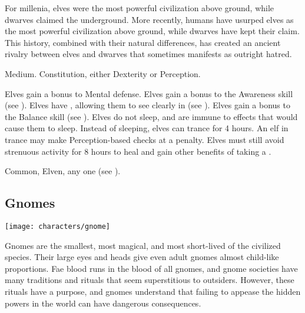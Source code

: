         For millenia, elves were the most powerful civilization above ground, while dwarves claimed the underground.
        More recently, humans have usurped elves as the most powerful civilization above ground, while dwarves have kept their claim.
        This history, combined with their natural differences, has created an ancient rivalry between elves and dwarves that sometimes manifests as outright hatred.

         Medium.
          Constitution, either  Dexterity or  Perception.
        \begin{raggeditemize}
             Elves gain a  bonus to Mental defense.
             Elves gain a  bonus to the Awareness skill (see ).
             Elves have , allowing them to see clearly in  (see ).
             Elves gain a  bonus to the Balance skill (see ).
             Elves do not sleep, and are immune to \magical effects that would cause them to sleep.
                Instead of sleeping, elves can trance for 4 hours.
                An elf in trance may make Perception-based checks at a  penalty.
                Elves must still avoid strenuous activity for 8 hours to heal and gain other benefits of taking a .
        \end{raggeditemize}
         Common, Elven, any one  (see ).

    \subsection{Gnomes}
        \texttt{[image: characters/gnome]}

        Gnomes are the smallest, most magical, and most short-lived of the civilized species.
        Their large eyes and heads give even adult gnomes almost child-like proportions.
        Fae blood runs in the blood of all gnomes, and gnome societies have many traditions and rituals that seem superstitious to outsiders.
        However, these rituals have a purpose, and gnomes understand that failing to appease the hidden powers in the world can have dangerous consequences.

